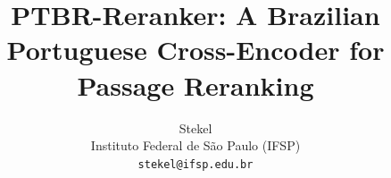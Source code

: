 \documentclass[11pt]{article}
\title{PTBR-Reranker: A Brazilian Portuguese Cross-Encoder for Passage Reranking}
\author{Stekel \\
  Instituto Federal de São Paulo (IFSP) \\
  \texttt{stekel@ifsp.edu.br}}
\date{}
\begin{document}
\maketitle

\begin{abstract}

\end{abstract}















\appendix

\end{document}
